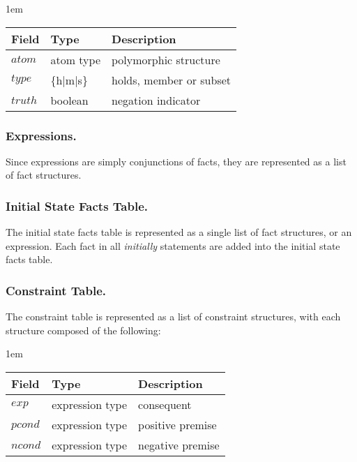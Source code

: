 \documentclass[global,twocolumn,final]{svjour}
\newenvironment{vquote}
  {\begin{list}{}{\leftmargin 1em}\item[]}
  {\end{list}}
\begin{document}
        \begin{vquote}
          \begin{tabular}[t]{|l|l|l|}
            \hline
            \textbf{Field} & \textbf{Type} & \textbf{Description} \\
            \hline
            $atom$ & atom type & polymorphic structure \\
            \hline
            $type$ & \{h$|$m$|$s\} & holds, member or subset \\
            \hline
            $truth$ & boolean & negation indicator \\
            \hline
          \end{tabular}
        \end{vquote}

      \subsubsection{Expressions.}

        Since expressions are simply conjunctions of facts, they are
        represented as a list of fact structures.

      \subsubsection{Initial State Facts Table.}

        The initial state facts table is represented as a single list of
        fact structures, or an expression. Each fact in all {\em initially}
        statements are added into the initial state facts table.

      \subsubsection{Constraint Table.}

        The constraint table is represented as a list of constraint
        structures, with each structure composed of the following:

        \begin{vquote}
          \begin{tabular}[t]{|l|l|l|}
            \hline
            \textbf{Field} & \textbf{Type} & \textbf{Description} \\
            \hline
            $exp$ & expression type & consequent \\
            \hline
            $pcond$ & expression type & positive premise \\
            \hline
            $ncond$ & expression type & negative premise \\
            \hline
          \end{tabular}
        \end{vquote}
\end{document}
